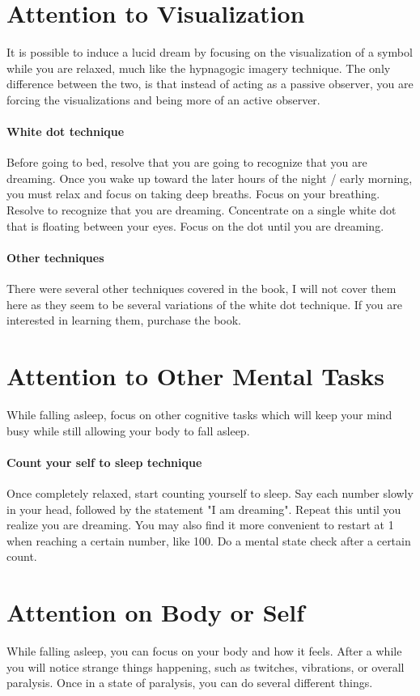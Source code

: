 \documentclass{report}
\begin{document}
\section{Attention to Visualization}
It is possible to induce a lucid dream by focusing on the visualization of a symbol while you are relaxed, much like the hypnagogic imagery technique. The only difference between the two, is that instead of acting as a passive observer, you are forcing the visualizations and being more of an active observer.

\paragraph{White dot technique} Before going to bed, resolve that you are going to recognize that you are dreaming. Once you wake up toward the later hours of the night / early morning, you must relax and focus on taking deep breaths. Focus on your breathing. Resolve to recognize that you are dreaming. Concentrate on a single white dot that is floating between your eyes. Focus on the dot until you are dreaming. 


\paragraph{Other techniques} There were several other techniques covered in the book, I will not cover them here as they seem to be several variations of the white dot technique. If you are interested in learning them, purchase the book.

\section{Attention to Other Mental Tasks}
While falling asleep, focus on other cognitive tasks which will keep your mind busy while still allowing your body to fall asleep. 

\paragraph{Count your self to sleep technique}
Once completely relaxed, start counting yourself to sleep. Say each number slowly in your head, followed by the statement "I am dreaming". Repeat this until you realize you are dreaming. You may also find it more convenient to restart at 1 when reaching a certain number, like 100. Do a mental state check after a certain count. 

\section{Attention on Body or Self}
While falling asleep, you can focus on your body and how it feels. After a while you will notice strange things happening, such as twitches, vibrations, or overall paralysis. Once in a state of paralysis, you can do several different things.
\end{document}
